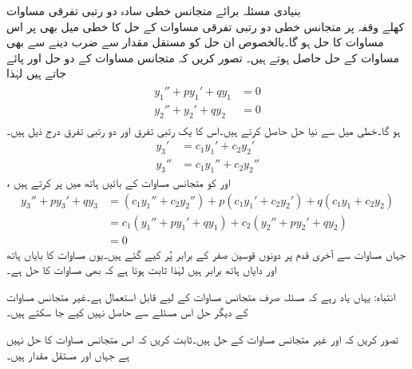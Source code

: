 \quad بنیادی مسئلہ برائے متجانس خطی سادہ دو رتبی تفرقی مساوات\\
کھلے وقفہ  پر متجانس خطی دو رتبی تفرقی مساوات  کے حل کا خطی میل بھی  پر اس مساوات کا حل ہو گا۔بالخصوص ان حل کو مستقل مقدار سے ضرب دینے سے بھی مساوات کے حل حاصل ہوتے ہیں۔
 تصور کریں کہ متجانس مساوات  کے دو حل  اور  پائے جاتے ہیں لہٰذا
\begin{gather}
\begin{aligned}\label{مساوات_درجہ_دو_خطی_میل}
y_1''+py_1'+qy_1&=0\\
y_2''+y_2'+qy_2&=0
\end{aligned}
\end{gather}
ہو گا۔خطی میل سے نیا حل  حاصل کرتے ہیں۔اس کا یک رتبی تفرق اور دو رتبی تفرق درج ذیل ہیں۔
\begin{align*}
y_3' &=c_1y_1'+c_2y_2'\\
y_3'' &=c_1 y_1''+c_2y_2''
\end{align*}
،  اور  کو متجانس مساوات کے بائیں ہاتھ میں پر کرتے ہیں
\begin{align*}
y_3''+py_3'+qy_3&=(c_1 y_1''+c_2y_2'')+p(c_1y_1'+c_2y_2')+q(c_1 y_1+c_2 y_2)\\
&=c_1(y_1''+py_1'+qy_1)+c_2(y_2''+py_2'+qy_2)\\
&=0
\end{align*}
جہاں مساوات  سے آخری قدم پر دونوں قوسین صفر کے برابر پُر کیے گئے ہیں۔یوں مساوات کا بایاں ہاتھ اور دایاں ہاتھ برابر ہیں لہٰذا ثابت ہوتا ہے کہ  بھی مساوات    کا حل ہے۔

انتباہ: یہاں یاد رہے کہ مسئلہ  صرف متجانس مساوات کے لیے قابل استعمال ہے۔غیر متجانس مساوات کے دیگر حل اس مسئلے سے حاصل نہیں کیے جا سکتے ہیں۔

تصور کریں کہ  اور  غیر متجانس مساوات  کے حل ہیں۔ثابت کریں کہ  اس متجانس مساوات کا حل نہیں ہے جہاں  اور  مستقل مقدار ہیں۔

